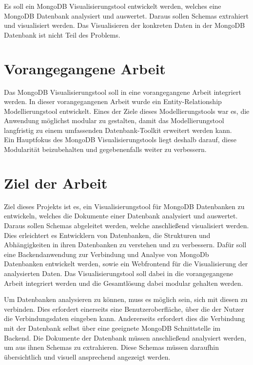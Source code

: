 Es soll ein MongoDB Visualisierungstool entwickelt werden, welches eine MongoDB Datenbank analysiert und auswertet.
Daraus sollen Schemas extrahiert und visualisiert werden.
Das Visualisieren der konkreten Daten in der MongoDB Datenbank ist nicht Teil des Problems.

\section{Vorangegangene Arbeit}
\label{sec:vorangegangene_arbeit}

Das MongoDB Visualisierungstool soll in eine vorangegangene Arbeit integriert werden.
In dieser vorangegangenen Arbeit wurde ein Entity-Relationship Modellierungstool entwickelt.
Eines der Ziele dieses Modellierungstools war es, die Anwendung möglichst modular zu gestalten, damit das Modellierungstool langfristig zu einem umfassenden Datenbank-Toolkit erweitert werden kann.
~\autocite{ruttmann:projektarbeit}
Ein Hauptfokus des MongoDB Visualisierungstools liegt deshalb darauf, diese Modularität beizubehalten und gegebenenfalls weiter zu verbessern.

\section{Ziel der Arbeit}
\label{sec:ziel}

Ziel dieses Projekts ist es, ein Visualisierungstool für MongoDB Datenbanken zu entwickeln, welches die Dokumente einer Datenbank analysiert und auswertet.
Daraus sollen Schemas abgeleitet werden, welche anschließend visualisiert werden.
Dies erleichtert es Entwicklern von Datenbanken, die Strukturen und Abhängigkeiten in ihren Datenbanken zu verstehen und zu verbessern.
Dafür soll eine Backendanwendung zur Verbindung und Analyse von MongoDb Datenbanken entwickelt werden, sowie ein Webfrontend für die Visualisierung der analysierten Daten.
Das Visualisierungstool soll dabei in die vorangegangene Arbeit integriert werden und die Gesamtlösung dabei modular gehalten werden.

Um Datenbanken analysieren zu können, muss es möglich sein, sich mit diesen zu verbinden.
Dies erfordert einerseits eine Benutzeroberfläche, über die der Nutzer die Verbindungsdaten eingeben kann.
Andererseits erfordert dies die Verbindung mit der Datenbank selbst über eine geeignete MongoDB Schnittstelle im Backend.
Die Dokumente der Datenbank müssen anschließend analysiert werden, um aus ihnen Schemas zu extrahieren.
Diese Schemas müssen daraufhin übersichtlich und visuell ansprechend angezeigt werden.

